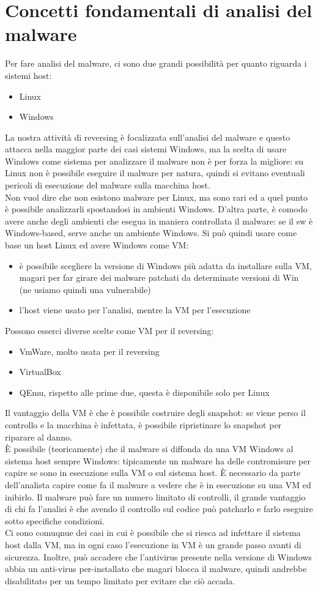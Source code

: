 \documentclass{article}
\begin{document}
\section{Concetti fondamentali di analisi del malware}
Per fare analisi del malware, ci sono due grandi possibilità per quanto riguarda i sistemi host:
\begin{itemize}
\item Linux
\item Windows
\end{itemize}
La nostra attività di reversing è focalizzata sull'analisi del malware e questo attacca nella maggior parte dei casi sistemi Windows, ma la scelta di usare Windows come sistema per analizzare il malware non è per forza la migliore: su Linux non è possibile eseguire il malware per natura, quindi si evitano eventuali pericoli di esecuzione del malware sulla macchina host.\\ Non vuol dire che non esistono malware per Linux, ma sono rari ed a quel punto è possibile analizzarli spostandosi in ambienti Windows. D'altra parte, è comodo avere anche degli ambienti che esegua in maniera controllata il malware: se il sw è Windows-based, serve anche un ambiente Windows. Si può quindi usare come base un host Linux ed avere Windows come VM:
\begin{itemize}
\item è possibile scegliere la versione di Windows più adatta da installare sulla VM, magari per far girare dei malware patchati da determinate versioni di Win (ne usiamo quindi una vulnerabile)
\item l'host viene usato per l'analisi, mentre la VM per l'esecuzione
\end{itemize}
Possono esserci diverse scelte come VM per il reversing:
\begin{itemize}
\item VmWare, molto usata per il reversing
\item VirtualBox
\item QEmu, rispetto alle prime due, questa è disponibile solo per Linux
\end{itemize}
Il vantaggio della VM è che è possibile costruire degli snapshot: se viene perso il controllo e la macchina è infettata, è possibile ripristinare lo snapshot per riparare al danno.\\ È possibile (teoricamente) che il malware si diffonda da una VM Windows al sistema host sempre Windows: tipicamente un malware ha delle contromisure per capire se sono in esecuzione sulla VM o sul sistema host. È necessario da parte dell'analista capire come fa il malware a vedere che è in esecuzione su una VM ed inibirlo. Il malware può fare un numero limitato di controlli, il grande vantaggio di chi fa l'analisi è che avendo il controllo sul codice può patcharlo e farlo eseguire sotto specifiche condizioni.\\ Ci sono comuqnue dei casi in cui è possibile che si riesca ad infettare il sistema host dalla VM, ma in ogni caso l'esecuzione in VM è un grande passo avanti di sicurezza. Inoltre, può accadere che l'antivirus presente nella versione di Windows abbia un anti-virus per-installato che magari blocca il malware, quindi andrebbe disabilitato per un tempo limitato per evitare che ciò accada.
\end{document}
